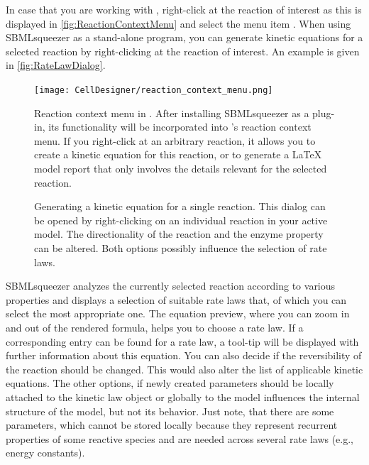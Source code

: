 In case that you are working with \CellDesigner, right-click at the reaction of interest as this is displayed in \vref{fig:ReactionContextMenu} and select the menu item .
When using SBMLsqueezer as a stand-alone program, you can generate kinetic equations for a selected reaction by right-clicking at the reaction of interest.
An example is given in \vref{fig:RateLawDialog}.
\begin{figure}
\texttt{[image: CellDesigner/reaction\_context\_menu.png]}
\caption[Reaction context menu in \CellDesigner]{Reaction context menu in \CellDesigner.
After installing SBMLsqueezer as a plug-in, its functionality will be incorporated into \CellDesigner's reaction context menu.
If you right-click at an arbitrary reaction, it allows you to create a kinetic equation for this reaction, or to generate a \LaTeX{} model report that only involves the details relevant for the selected reaction.}
\label{fig:ReactionContextMenu}
\end{figure}
\begin{figure}[b!]
\caption[Generating a kinetic equation for a single reaction]{Generating a kinetic equation for a single reaction.
This dialog can be opened by right-clicking on an individual reaction in your active model.
The directionality of the reaction and the enzyme property can be altered.
Both options possibly influence the selection of rate laws.}
\label{fig:RateLawDialog}
\end{figure}
SBMLsqueezer analyzes the currently selected reaction according to various properties
and displays a selection of suitable rate laws that, of which you can select
the most appropriate one. The equation preview, where you can zoom in and out
of the rendered formula, helps you to choose a rate law. If a corresponding
\SBO entry can be found for a rate law, a tool-tip will be displayed with further
information about this equation.
You can also decide if the reversibility of the reaction should be changed.
This would also alter the list of applicable kinetic equations.
The other options, if newly created
parameters should be locally attached to the kinetic law object or globally to
the model influences the internal structure of the model, but not its behavior.
Just note, that there are some parameters, which cannot be stored locally because
they represent recurrent properties of some reactive species and are needed
across several rate laws (e.g., energy constants).

